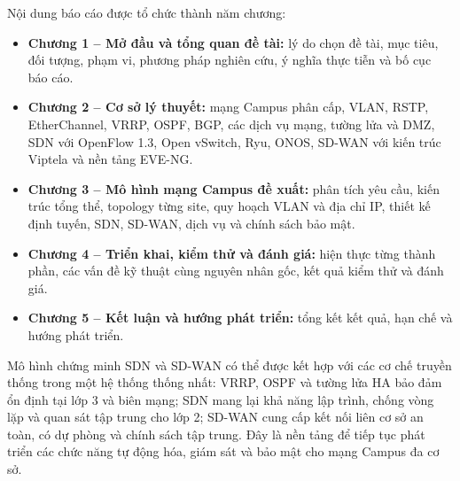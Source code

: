 \newpage

Nội dung báo cáo được tổ chức thành năm chương:

\begin{itemize}
    \item[-] \textbf{Chương 1 -- Mở đầu và tổng quan đề tài:} lý do chọn đề tài, mục tiêu, đối tượng, phạm vi, phương pháp nghiên cứu, ý nghĩa thực tiễn và bố cục báo cáo.
    \item[-] \textbf{Chương 2 -- Cơ sở lý thuyết:} mạng Campus phân cấp, VLAN, RSTP, EtherChannel, VRRP, OSPF, BGP, các dịch vụ mạng, tường lửa và DMZ, SDN với OpenFlow 1.3, Open vSwitch, Ryu, ONOS, SD-WAN với kiến trúc Viptela và nền tảng EVE-NG.
    \item[-] \textbf{Chương 3 -- Mô hình mạng Campus đề xuất:} phân tích yêu cầu, kiến trúc tổng thể, topology từng site, quy hoạch VLAN và địa chỉ IP, thiết kế định tuyến, SDN, SD-WAN, dịch vụ và chính sách bảo mật.
    \item[-] \textbf{Chương 4 -- Triển khai, kiểm thử và đánh giá:} hiện thực từng thành phần, các vấn đề kỹ thuật cùng nguyên nhân gốc, kết quả kiểm thử và đánh giá.
    \item[-] \textbf{Chương 5 -- Kết luận và hướng phát triển:} tổng kết kết quả, hạn chế và hướng phát triển.
\end{itemize}

Mô hình chứng minh SDN và SD-WAN có thể được kết hợp với các cơ chế truyền thống trong một hệ thống thống nhất: VRRP, OSPF và tường lửa HA bảo đảm ổn định tại lớp 3 và biên mạng; SDN mang lại khả năng lập trình, chống vòng lặp và quan sát tập trung cho lớp 2; SD-WAN cung cấp kết nối liên cơ sở an toàn, có dự phòng và chính sách tập trung. Đây là nền tảng để tiếp tục phát triển các chức năng tự động hóa, giám sát và bảo mật cho mạng Campus đa cơ sở.

\newpage
